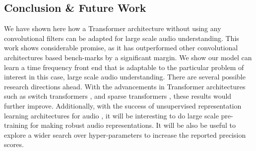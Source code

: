 \documentclass{article}
\begin{document}
\begin{sloppy}
\section{Conclusion \& Future Work}
\label{sec:conclusion}
We have shown here how a Transformer architecture without using any convolutional filters can be adapted for large scale audio understanding. This work shows considerable promise, as it has outperformed other convolutional architectures based bench-marks by a significant margin. We show our model can learn a time frequency front end that is adaptable to the particular problem of interest in this case, large scale audio understanding.  
There are several possible research directions ahead. With the advancements in Transformer architectures such as switch transformers \cite{fedus_zoph_shazeer_2021}, and sparse transformers \cite{child2019generating}, these results would further improve. Additionally, with the success of unsupervised representation learning architectures for audio \cite{verma2020framework}, it will be interesting to do large scale pre-training for making robust audio representations. It will be also be useful to explore a wider search over hyper-parameters to increase the reported precision scores. 








\end{sloppy}
\end{document}
